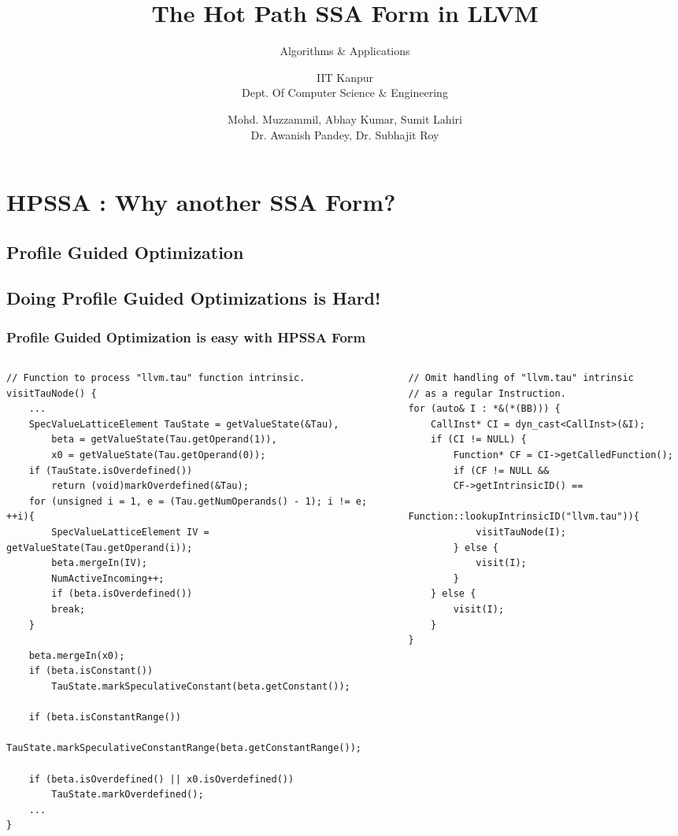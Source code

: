 \documentclass[aspectratio=169, compress]{beamer}
\title[\url{https://google.com}] %
{The Hot Path SSA Form in LLVM}
\subtitle{Algorithms \& Applications}
\author[Profile Guided Optimizations using HPSSA Form in LLVM] %
{IIT Kanpur \\ Dept. Of Computer Science \& Engineering}
\institute[IDK] %
{
	\inst{1}%
	IIT Kanpur\\
	PRAISE Group
}
\date[01/03/2022] %
{Mohd. Muzzammil, Abhay Kumar, Sumit Lahiri \\ Dr. Awanish Pandey, Dr. Subhajit Roy}
\begin{document}
\frame{\titlepage}

\footnotesize
\section{HPSSA : Why another SSA Form?}
\subsection{Profile Guided Optimization}
{
	
}
\subsection{Doing Profile Guided Optimizations is Hard!}
{
	
}
\begin{frame}[fragile]
	\frametitle{Profile Guided Optimization is easy with HPSSA Form}
	\begin{columns}
		\begin{column}{0.5\textwidth}
	\begin{verbatim}
// Function to process "llvm.tau" function intrinsic.
visitTauNode() {
	...
	SpecValueLatticeElement TauState = getValueState(&Tau), 
		beta = getValueState(Tau.getOperand(1)), 
		x0 = getValueState(Tau.getOperand(0));
	if (TauState.isOverdefined())
		return (void)markOverdefined(&Tau);
	for (unsigned i = 1, e = (Tau.getNumOperands() - 1); i != e; ++i){
		SpecValueLatticeElement IV = getValueState(Tau.getOperand(i));
		beta.mergeIn(IV);
		NumActiveIncoming++;
		if (beta.isOverdefined())
		break;
	}
	
	beta.mergeIn(x0);
	if (beta.isConstant())
		TauState.markSpeculativeConstant(beta.getConstant());
	
	if (beta.isConstantRange())
		TauState.markSpeculativeConstantRange(beta.getConstantRange());
	
	if (beta.isOverdefined() || x0.isOverdefined())
		TauState.markOverdefined();
	...
}
\end{verbatim}
		\end{column}
	\begin{column}{0.01\textwidth} \end{column}
		\begin{column}{0.4\textwidth}  
			\begin{verbatim}
// Omit handling of "llvm.tau" intrinsic 
// as a regular Instruction.
for (auto& I : *&(*(BB))) {
	CallInst* CI = dyn_cast<CallInst>(&I);
	if (CI != NULL) {
		Function* CF = CI->getCalledFunction();
		if (CF != NULL &&
		CF->getIntrinsicID() == 
			Function::lookupIntrinsicID("llvm.tau")){
			visitTauNode(I);
		} else {
			visit(I);
		} 
	} else {
		visit(I);
	}
}
			\end{verbatim}
		\end{column}
	\end{columns}
\end{frame}
\end{document}
